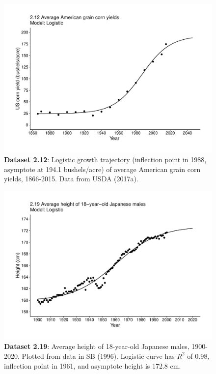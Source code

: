\documentclass[aps,rmp,preprint,superscriptaddress,10pt,onecolumn]{article}
\begin{document}
\clearpage
\begin{figure}[h]
\includegraphics[width=\textwidth]{output/figs-ggplot/2.12.pdf}
\caption{\textbf{Dataset 2.12}: Logistic growth trajectory (inflection point in 1988, asymptote at 194.1 bushels/acre) of average American grain corn yields, 1866-2015. Data from USDA (2017a).}
\end{figure}
	
\clearpage
\begin{figure}[h]
\includegraphics[width=\textwidth]{output/figs-ggplot/2.19.pdf}
\caption{\textbf{Dataset 2.19}: Average height of 18-year-old Japanese males, 1900-2020. Plotted from data in SB (1996). Logistic curve has $R^2$ of 0.98, inflection point in 1961, and asymptote height is 172.8 cm. }
\end{figure}
	
\end{document}
